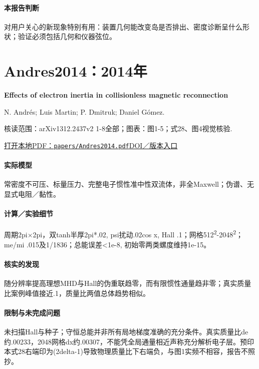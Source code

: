 \paragraph{本报告判断}对用户关心的新现象特别有用：装置几何能改变岛是否排出、密度诊断呈什么形状；验证必须包括几何和仪器弦位。

\section{Andres2014：2014年}\label{paper:Andres2014}

\textbf{Effects of electron inertia in collisionless magnetic reconnection}\citep{Andres2014}\

N. Andrés;  Luis Martin;  P. Dmitruk;  Daniel Gómez.

\textsf{核读范围：}arXiv1312.2437v2 1-8全部；\textsf{图表：}图1-5；式28、图4视觉核验.

\href{run:papers/Andres2014.pdf}{打开本地PDF：\texttt{papers/Andres2014.pdf}}\quad\href{https://doi.org/10.1063/1.4890021}{DOI／版本入口}

\paragraph{实际模型}常密度不可压、标量压力、完整电子惯性准中性双流体，非全Maxwell；伪谱、无显式电阻／黏性。

\paragraph{计算／实验细节}周期2pi×2pi，双tanh半厚2pi*.02, psi扰动.02cos x, Hall .1；网格512\textsuperscript{2}-2048\textsuperscript{2}；me/mi .015及1/1836；总能误差<1e-8, 初始零两类螺度维持1e-15。

\paragraph{核实的发现}随分辨率提高理想MHD与Hall的伪重联趋零，而有限惯性通量趋非零；真实质量比案例峰值接近.1，质量比两值总体趋势相似。

\paragraph{限制与未完成问题}未扫描Hall与种子；守恒总能并非所有局地梯度准确的充分条件。真实质量比de约.00233，2048网格dx约.00307，不能凭全局通量相近声称充分解析电子层。预印本式28右端印为(2delta-1)导致物理质量比下右端负，与图1实频不相容，报告不照抄。

